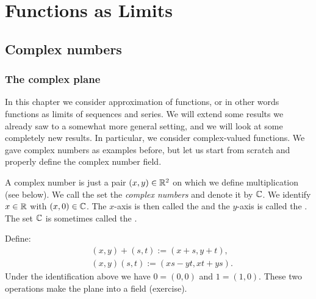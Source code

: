 
\chapter{Functions as Limits} \label{approx:chapter}


\section{Complex numbers}
\label{sec:complexnums}


\subsection{The complex plane}

In this chapter we consider approximation of functions, or in other words
functions as limits of sequences and series.
We will extend some results we already saw to a somewhat more
general setting, and we will look at some completely new results.
In particular, we consider complex-valued functions.
We gave complex numbers as examples before, but
let us start from scratch and properly define the complex number field.

A complex number is just a pair $(x,y) \in {\mathbb{R}}^2$ on which we define
multiplication (see below).
We call the set the \emph{complex numbers}
and denote it by ${\mathbb{C}}$.
We identify $x \in {\mathbb{R}}$ with $(x,0) \in {\mathbb{C}}$.
The $x$-axis is then called the \emph{} and the $y$-axis is
called the \emph{}.  The set ${\mathbb{C}}$ is sometimes called the
\emph{}.

Define:
\begin{align*}
& (x,y) + (s,t) := (x+s,y+t) , \\
& (x,y) (s,t) := (xs-yt,xt+ys) .
\end{align*}
Under the identification above we have $0 = (0,0)$ and $1 = (1,0)$.  These
two operations make the plane into a field (exercise).

